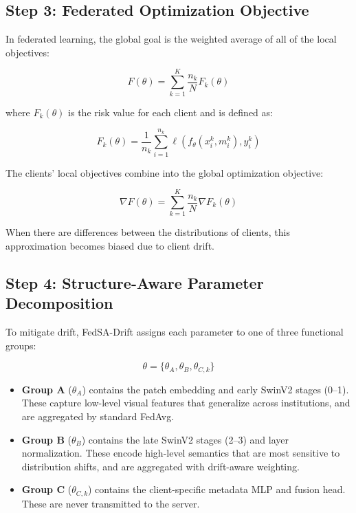 \documentclass[utf8]{FrontiersinHarvard} %
\newcommand{\sadrift}{FedSA-Drift}
\begin{document}
\subsection{Step 3: Federated Optimization Objective}

In federated learning, the global goal is the weighted average of all of the local objectives:

\begin{equation}
\label{eq:fed_objective}
F(\theta) = \sum_{k=1}^{K} \frac{n_k}{N} F_k(\theta)
\end{equation}

where $F_k(\theta)$ is the risk value for each client and is defined as:

\begin{equation}
\label{eq:local_risk}
F_k(\theta) = \frac{1}{n_k} \sum_{i=1}^{n_k} \ell(f_\theta(x_i^k,m_i^k), y_i^k)
\end{equation}

The clients' local objectives combine into the global optimization objective:

\begin{equation}
\label{eq:fed_gradient}
\nabla F(\theta) = \sum_{k=1}^{K} \frac{n_k}{N} \nabla F_k(\theta)
\end{equation}

When there are differences between the distributions of clients, this approximation becomes biased due to client drift.

\subsection{Step 4: Structure-Aware Parameter Decomposition}

To mitigate drift, \sadrift{} assigns each parameter to one of three functional groups:

\begin{equation}
\label{eq:param_decomp}
\theta = \{\theta_A, \theta_B, \theta_{C,k}\}
\end{equation}

\begin{itemize}
\item \textbf{Group A} ($\theta_A$) contains the patch embedding and early SwinV2 stages (0--1). These capture low-level visual features that generalize across institutions, and are aggregated by standard FedAvg.
\item \textbf{Group B} ($\theta_B$) contains the late SwinV2 stages (2--3) and layer normalization. These encode high-level semantics that are most sensitive to distribution shifts, and are aggregated with drift-aware weighting.
\item \textbf{Group C} ($\theta_{C,k}$) contains the client-specific metadata MLP and fusion head. These are never transmitted to the server.
\end{itemize}
\end{document}
